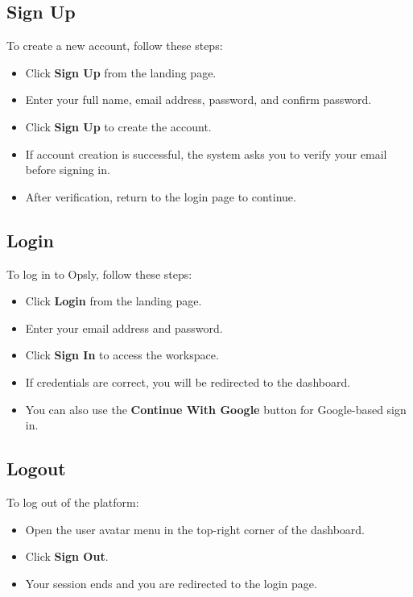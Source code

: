 \subsection{Sign Up}
To create a new account, follow these steps:
\begin{itemize}
    \item Click \textbf{Sign Up} from the landing page.
    \item Enter your full name, email address, password, and confirm password.
    \item Click \textbf{Sign Up} to create the account.
    \item If account creation is successful, the system asks you to verify your email before signing in.
    \item After verification, return to the login page to continue.
\end{itemize}

\subsection{Login}
To log in to Opsly, follow these steps:
\begin{itemize}
    \item Click \textbf{Login} from the landing page.
    \item Enter your email address and password.
    \item Click \textbf{Sign In} to access the workspace.
    \item If credentials are correct, you will be redirected to the dashboard.
    \item You can also use the \textbf{Continue With Google} button for Google-based sign in.
\end{itemize}

\subsection{Logout}
To log out of the platform:
\begin{itemize}
    \item Open the user avatar menu in the top-right corner of the dashboard.
    \item Click \textbf{Sign Out}.
    \item Your session ends and you are redirected to the login page.
\end{itemize}

